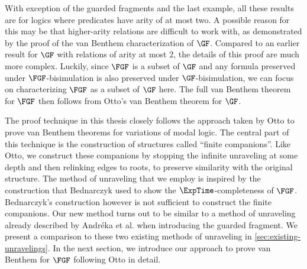 With exception of the guarded fragments and the last example, all these results are for logics where predicates have arity of at most two.
A possible reason for this may be that higher-arity relations are difficult to work with, as demonstrated by the proof of the van Benthem characterization of $\GF$\cite{Otto2012}.
Compared to an earlier result for $\GF$ with relations of arity at most 2\cite{Otto04}, the details of this proof are much more complex.
Luckily, since $\FGF$ is a subset of $\GF$ and any formula preserved under $\FGF$-bisimulation is also preserved under $\GF$-bisimulation, we can focus on characterizing $\FGF$ as a subset of $\GF$ here.
The full van Benthem theorem for $\FGF$ then follows from Otto's van Benthem theorem for $\GF$.

The proof technique in this thesis closely follows the approach taken by Otto to prove van Benthem theorems for variations of modal logic\cite{Otto04, otto2004a}.
The central part of this technique is the construction of structures called ``finite companions''.
Like Otto, we construct these companions by stopping the infinite unraveling at some depth and then relinking edges to roots, to preserve similarity with the original structure.
The method of unraveling that we employ is inspired by the construction that Bednarczyk used to show the $\ExpTime$-completeness of $\FGF$\cite{Bednarczyk21}.
Bednarczyk's construction however is not sufficient to construct the finite companions.
Our new method turns out to be similar to a method of unraveling already described by Andréka et al. when introducing the guarded fragment\cite{AndrekaNB98}.
We present a comparison to these two existing methods of unraveling in \cref{sec:existing-unravelings}.
In the next section, we introduce our approach to prove van Benthem for $\FGF$ following Otto in detail.

